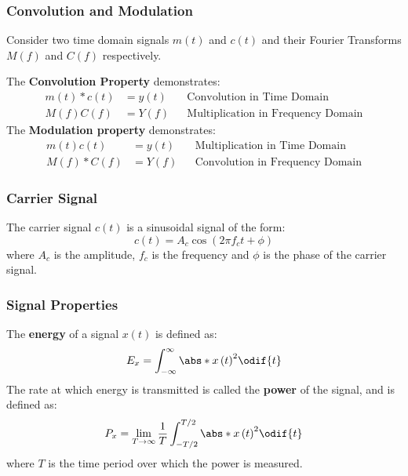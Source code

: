 \documentclass{article}
\begin{document}
\subsubsection{Convolution and Modulation}
Consider two time domain signals \(m\left( t \right)\) and \(c\left( t
\right)\) and their Fourier Transforms \(M\left( f \right)\) and
\(C\left( f \right)\) respectively.

The \textbf{Convolution Property} demonstrates:
\begin{align*}
    m\left( t \right) \ast c\left( t \right) & = y\left( t \right) &  & \text{Convolution in Time Domain}         \\
    M\left( f \right) C\left( f \right)      & = Y\left( f \right) &  & \text{Multiplication in Frequency Domain}
\end{align*}
The \textbf{Modulation property} demonstrates:
\begin{align*}
    m\left( t \right) c\left( t \right)      & = y\left( t \right) &  & \text{Multiplication in Time Domain}   \\
    M\left( f \right) \ast C\left( f \right) & = Y\left( f \right) &  & \text{Convolution in Frequency Domain}
\end{align*}
\subsubsection{Carrier Signal}
The carrier signal \(c\left( t \right)\) is a sinusoidal signal of the
form:
\begin{equation*}
    c\left( t \right) = A_c \cos{\left( 2 \pi f_c t + \phi \right)}
\end{equation*}
where \(A_c\) is the amplitude, \(f_c\) is the frequency and \(\phi\) is
the phase of the carrier signal.
\subsubsection{Signal Properties}
The \textbf{energy} of a signal \(x\left( t \right)\) is defined as:
\begin{equation*}
    E_x = \int_{-\infty}^{\infty} \abs*{x\left( t \right)}^2 \odif{t}
\end{equation*}
The rate at which energy is transmitted is called the \textbf{power} of
the signal, and is defined as:
\begin{equation*}
    P_x = \lim_{T \to \infty} \frac{1}{T} \int_{-T/2}^{T/2} \abs*{x\left( t \right)}^2 \odif{t}
\end{equation*}
where \(T\) is the time period over which the power is measured.
\end{document}
